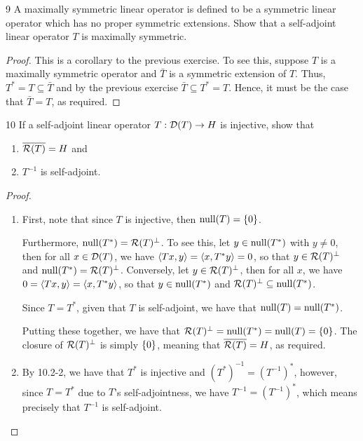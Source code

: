 \begin{exercise}{9}
A maximally symmetric linear operator is defined to be a symmetric linear operator which has no proper symmetric extensions.
Show that a self-adjoint linear operator $T$ is maximally symmetric.
\end{exercise}
\begin{proof}
This is a corollary to the previous exercise. 
To see this, suppose $T$ is a maximally symmetric operator and $\bar{T}$ is a symmetric extension of $T$.
Thus, $T^\ast = T \subseteq \bar{T}$ and by the previous exercise $\bar{T} \subseteq T^\ast = T$.
Hence, it must be the case that $\bar{T} = T$, as required.
\end{proof} 

\begin{exercise}{10}
If a self-adjoint linear operator $T: \mathcal{D}(T) \to H$ is injective, show that 
\begin{enumerate}
    \item $\overline{\mathcal{R}(T)} = H$ and
    \item $T^{-1}$ is self-adjoint.
\end{enumerate}
\end{exercise}
\begin{proof}
\begin{enumerate}
    \item First, note that since $T$ is injective, then $\operatorname*{null}(T) = \{0\}$.
    
    Furthermore, $\operatorname*{null}(T^\ast) = \mathcal{R}(T)^\perp$.
    To see this, let $y \in \operatorname*{null}(T^\ast)$ with $y \neq 0$, then for all $x \in \mathcal{D}(T)$, we have $\langle Tx, y\rangle = \langle x, T^\ast y\rangle = 0$, so that $y \in \mathcal{R}(T)^\perp$ and $\operatorname*{null}(T^\ast) = \mathcal{R}(T)^\perp$.
    Conversely, let $y \in \mathcal{R}(T)^\perp$, then for all $x$, we have $0 = \langle Tx, y\rangle = \langle x, T^\ast y\rangle$, so that $y \in \operatorname*{null}(T^\ast)$ and $\mathcal{R}(T)^\perp \subseteq \operatorname*{null}(T^\ast)$.

    Since $T = T^\ast$, given that $T$ is self-adjoint, we have that $\operatorname*{null}(T) = \operatorname*{null}(T^\ast)$.

    Putting these together, we have that $\mathcal{R}(T)^\perp = \operatorname*{null}(T^\ast) = \operatorname*{null}(T) = \{0\}$.
    The closure of $\mathcal{R}(T)^\perp$ is simply $\{0\}$, meaning that $\overline{\mathcal{R}(T)} = H$, as required.
    
    \item By 10.2-2, we have that $T^\ast$ is injective and $(T^\ast)^{-1} = (T^{-1})^\ast$, however, since $T = T^\ast$ due to $T$'s self-adjointness, we have $T^{-1} = (T^{-1})^\ast$, which means precisely that $T^{-1}$ is self-adjoint.
\end{enumerate}
\end{proof} 

